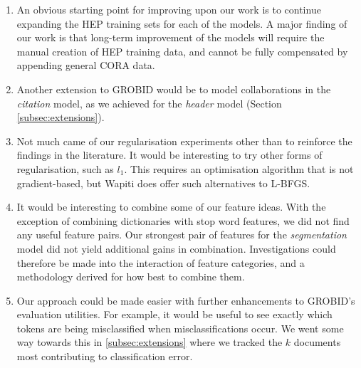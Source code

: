 \begin{enumerate}

\item An obvious starting point for improving upon our work is to continue expanding the HEP training sets for each of the models. A major finding of our work is that long-term improvement of the models will require the manual creation of HEP training data, and cannot be fully compensated by appending general CORA data.

\item Another extension to GROBID would be to model collaborations in the \emph{citation} model, as we achieved for the \emph{header} model (Section \ref{subsec:extensions}).

\item Not much came of our regularisation experiments other than to reinforce the findings in the literature. It would be interesting to try other forms of regularisation, such as $l_1$. This requires an optimisation algorithm that is not gradient-based, but Wapiti does offer such alternatives to L-BFGS.

\item It would be interesting to combine some of our feature ideas. With the exception of combining dictionaries with stop word features, we did not find any useful feature pairs. Our strongest pair of features for the \emph{segmentation} model did not yield additional gains in combination. Investigations could therefore be made into the interaction of feature categories, and a methodology derived for how best to combine them.

\item Our approach could be made easier with further enhancements to GROBID's evaluation utilities. For example, it would be useful to see exactly which tokens are being misclassified when misclassifications occur. We went some way towards this in \ref{subsec:extensions} where we tracked the $k$ documents most contributing to classification error.

\end{enumerate}

